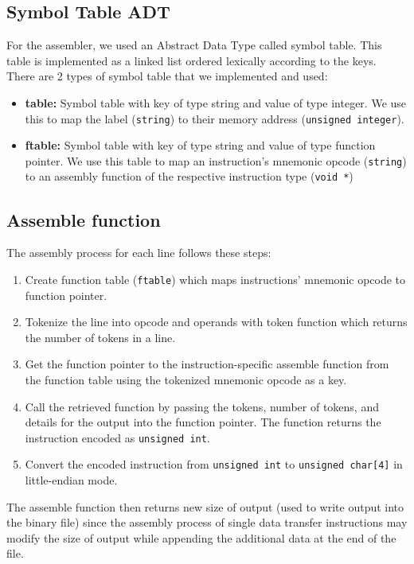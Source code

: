 \documentclass[11pt]{article}
\begin{document}
\subsection{Symbol Table ADT}
For the assembler, we used an Abstract Data Type called symbol table. This table is implemented as a linked list ordered lexically according to the keys. There are 2 types of symbol table that we implemented and used:
\begin{itemize}
    \item \textbf{table:} Symbol table with key of type string and value of type integer. We use this to map the label (\verb|string|) to their memory address (\verb|unsigned integer|).
    \item \textbf{ftable:} Symbol table with key of type string and value of type function pointer. We use this table to map an instruction’s mnemonic opcode (\verb|string|) to an assembly function of the respective instruction type (\verb|void *|)
\end{itemize}

\subsection{Assemble function}
The assembly process for each line follows these steps:
\begin{enumerate}
    \item Create function table (\verb|ftable|) which maps instructions’ mnemonic opcode to function pointer.
    \item Tokenize the line into opcode and operands with token function which returns the number of tokens in a line.
    \item Get the function pointer to the instruction-specific assemble function from the function table using the tokenized mnemonic opcode as a key.
    \item Call the retrieved function by passing the tokens, number of tokens, and details for the output into the function pointer. The function returns the instruction encoded as \verb|unsigned int|.
    \item Convert the encoded instruction from \verb|unsigned int| to \verb|unsigned char[4]| in little-endian mode.
\end{enumerate}

The assemble function then returns new size of output (used to write output into the binary file) since the assembly process of single data transfer instructions may modify the size of output while appending the additional data at the end of the file.
\end{document}
